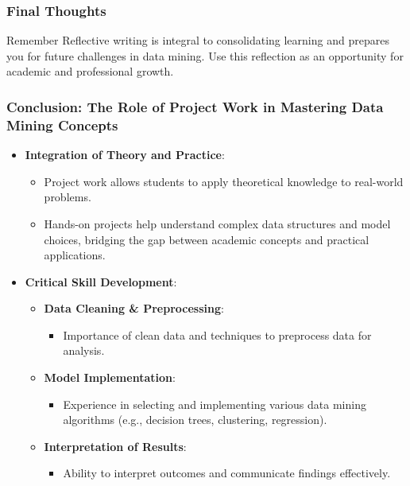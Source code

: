 \documentclass[aspectratio=169]{beamer}
\begin{document}
\begin{frame}[fragile]
    \frametitle{Final Thoughts}
    \begin{block}{Remember}
        Reflective writing is integral to consolidating learning and prepares you for future challenges in data mining. Use this reflection as an opportunity for academic and professional growth.
    \end{block}
\end{frame}

\begin{frame}[fragile]
    \frametitle{Conclusion: The Role of Project Work in Mastering Data Mining Concepts}
    
    \begin{itemize}
        \item \textbf{Integration of Theory and Practice}:
        \begin{itemize}
            \item Project work allows students to apply theoretical knowledge to real-world problems.
            \item Hands-on projects help understand complex data structures and model choices, bridging the gap between academic concepts and practical applications.
        \end{itemize}
        
        \item \textbf{Critical Skill Development}:
        \begin{itemize}
            \item \textbf{Data Cleaning \& Preprocessing}:
            \begin{itemize}
                \item Importance of clean data and techniques to preprocess data for analysis.
            \end{itemize}
            \item \textbf{Model Implementation}:
            \begin{itemize}
                \item Experience in selecting and implementing various data mining algorithms (e.g., decision trees, clustering, regression).
            \end{itemize}
            \item \textbf{Interpretation of Results}:
            \begin{itemize}
                \item Ability to interpret outcomes and communicate findings effectively.
            \end{itemize}
        \end{itemize}
    \end{itemize}
\end{frame}
\end{document}
